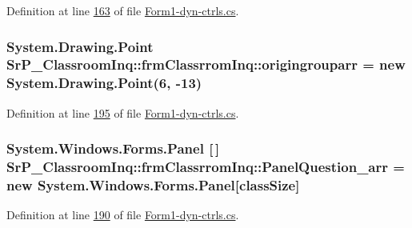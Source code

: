 \-Definition at line \hyperlink{_form1-dyn-ctrls_8cs_source_l00163}{163} of file \hyperlink{_form1-dyn-ctrls_8cs_source}{\-Form1-\/dyn-\/ctrls.\-cs}.

\hypertarget{class_sr_p___classroom_inq_1_1frm_classrrom_inq_ace01ba3289e75624d67b90f742c195f5}{
\subsubsection[{origingrouparr}]{\setlength{\rightskip}{0pt plus 5cm}\-System.\-Drawing.\-Point {\bf \-Sr\-P\-\_\-\-Classroom\-Inq\-::frm\-Classrrom\-Inq\-::origingrouparr} = new \-System.\-Drawing.\-Point(6, -\/13)}}
\label{class_sr_p___classroom_inq_1_1frm_classrrom_inq_ace01ba3289e75624d67b90f742c195f5}


\-Definition at line \hyperlink{_form1-dyn-ctrls_8cs_source_l00195}{195} of file \hyperlink{_form1-dyn-ctrls_8cs_source}{\-Form1-\/dyn-\/ctrls.\-cs}.

\hypertarget{class_sr_p___classroom_inq_1_1frm_classrrom_inq_a5c89025435cd16c638fbc91999b74f80}{
\subsubsection[{\-Panel\-Question\-\_\-arr}]{\setlength{\rightskip}{0pt plus 5cm}\-System.\-Windows.\-Forms.\-Panel \mbox{[}$\,$\mbox{]} {\bf \-Sr\-P\-\_\-\-Classroom\-Inq\-::frm\-Classrrom\-Inq\-::\-Panel\-Question\-\_\-arr} = new \-System.\-Windows.\-Forms.\-Panel\mbox{[}{\bf class\-Size}\mbox{]}}}
\label{class_sr_p___classroom_inq_1_1frm_classrrom_inq_a5c89025435cd16c638fbc91999b74f80}


\-Definition at line \hyperlink{_form1-dyn-ctrls_8cs_source_l00190}{190} of file \hyperlink{_form1-dyn-ctrls_8cs_source}{\-Form1-\/dyn-\/ctrls.\-cs}.

